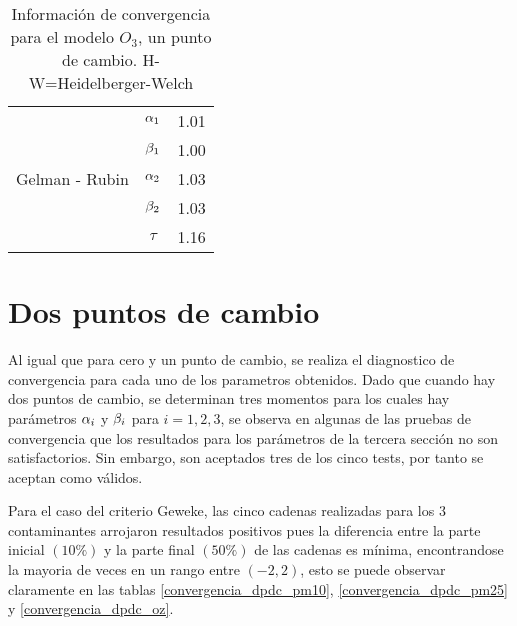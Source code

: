 \begin{table}[!h]
\begin{tabular}{|l|c|l|l|l|l|l|}
\multirow{5}{2.5cm}{Gelman - Rubin} & $\alpha_1$ & \multicolumn{5}{|c|}{1.01}\\ \cline{2-7}
&$\beta_1$ &  \multicolumn{5}{|c|}{1.00} \\ \cline{2-7}
&$\alpha_2$ &  \multicolumn{5}{|c|}{1.03} \\ \cline{2-7}
&$\beta_2$ &  \multicolumn{5}{|c|}{1.03} \\ \cline{2-7}
&$\tau$ &  \multicolumn{5}{|c|}{1.16} \\ \cline{1-7}



\end{tabular}
\caption{Información de convergencia para el modelo $O_3$, un punto de cambio. H-W=Heidelberger-Welch}
\label{convergencia_updc_ozono}
\end{table}



\section{Dos puntos de cambio}
Al igual que para cero y un punto de cambio, se realiza el diagnostico de convergencia para cada uno de los parametros obtenidos. Dado que cuando hay dos puntos de cambio, se determinan tres momentos para los cuales hay parámetros $\alpha_i$ y $\beta_i$ para $i=1,2,3$, se observa en algunas de las pruebas de convergencia que los resultados para los parámetros de la tercera sección no son satisfactorios. Sin embargo, son aceptados tres de los cinco tests, por tanto se aceptan como válidos. 

Para el caso del criterio Geweke, las cinco cadenas realizadas para los 3 contaminantes arrojaron resultados positivos pues la diferencia entre la parte inicial $(10\%)$ y la parte final $(50\%)$ de las cadenas es mínima, encontrandose la mayoria de veces en un rango entre $(-2,2)$, esto se puede observar claramente en las tablas \ref{convergencia_dpdc_pm10}, \ref{convergencia_dpdc_pm25} y \ref{convergencia_dpdc_oz}.





